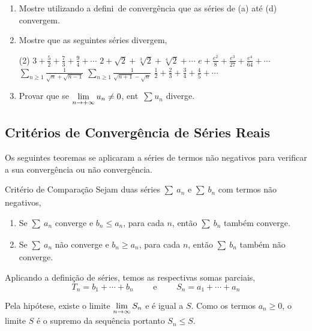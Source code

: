 \begin{enumerate}[label=\rm{(\arabic*)}]
\item Mostre utilizando a defini\cao\ de converg\^encia que as s\'eries de (a) at\'e (d) convergem.
\item Mostre que as seguintes s\'eries  divergem,
\begin{tasks}[label=(\alph*),item-indent=6em,label-width=4ex,ref=(\alph*)](2)
\task \(\displaystyle{3+\frac{5}{2}+\frac{7}{3}+\frac{9}{4}+\cdots}\)
\task \(\displaystyle{2+\sqrt{2}+\sqrt[3]{2}+\sqrt[4]{2}+\cdots}\)
\task \(\displaystyle{e+\frac{e^2}{8}+\frac{e^3}{27}+\frac{e^4}{64}+\cdots}\)
\task \(\displaystyle{\sum_{n\geq1}\frac{1}{\sqrt{n}+\sqrt{n-1}}}\)
\task \(\displaystyle{\sum_{n\geq 1}\frac{1}{\sqrt{n+1}-\sqrt{n}}}\)
\task \(\displaystyle{\frac{1}{2}+\frac{2}{3}+\frac{3}{4}+\frac{4}{5}+\cdots}\)
\end{tasks}

\item Provar que se $\displaystyle{\lim_{n\to+\infty}u_n\not=0}$, ent\ao\ $\sum_{}u_{n}$ diverge.
\end{enumerate}

\subsection{Crit\'{e}rios de Converg\^{e}ncia de S\'{e}ries Reais}
 Os seguintes teoremas se aplicaram a s\'{e}ries de termos
n\~{a}o negativos para verificar a sua converg\^{e}ncia ou n\~{a}o
converg\^{e}ncia.

\begin{theoc}{Crit\'{e}rio de Compara\c{c}\~{a}o}{}
Sejam duas s\'{e}ries $\sum_{}\,a_{n}$ e
$\sum_{}\,b_{n}$ com termos n\~{a}o negativos,
\begin{enumerate}[label=\rm{(\alph*)},leftmargin=4em,ref=\rm{(\alph*)}]
\item Se $\sum_{}\,a_{n}$ converge e $b_n\leq a_n$, para
cada $n$, ent\~{a}o $\sum_{}\,b_{n}$ tamb\'{e}m converge.
\item Se $\sum_{}\,a_{n}$ n\~{a}o converge e $b_n\geq a_n$, para
cada $n$, ent\~{a}o $\sum_{}\,b_{n}$ tamb\'{e}m n\~{a}o converge.
\end{enumerate}
\end{theoc}

\prova Aplicando a defini\c{c}\~{a}o de s\'{e}ries, temos as respectivas somas
parciais,
\begin{equation*}
    T_n=b_1+\cdots+b_n\qquad\text{ e }\qquad S_n=a_1+\cdots+a_n
\end{equation*}

Pela hip\'{o}tese, existe o limite $\displaystyle{\lim_{n\to \infty}S_n}$ e \'{e}
igual a $S$. Como os termos $a_n\ge 0$, o limite $S$ \'{e} o supremo
da sequ\^{e}ncia portanto $S_n\le S$.

